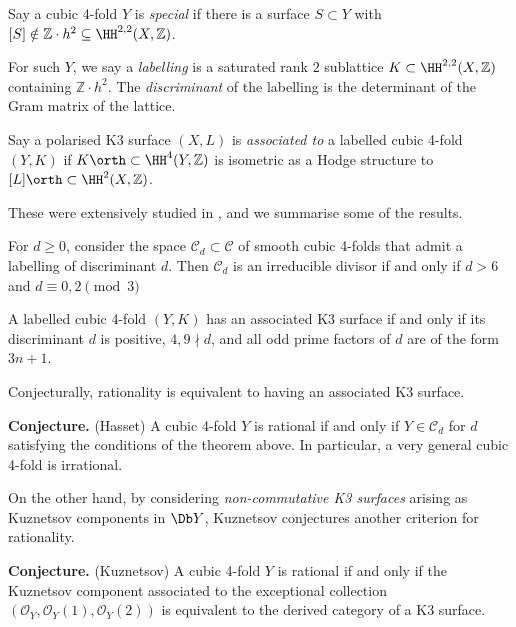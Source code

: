 \begin{definition}
    Say a cubic 4-fold \(Y\) is \textit{special} if there is a surface
    \(S\subset Y\) with \([S]\notin \mathbb{Z}\cdot h^2\subseteq
    \HH^{2,2}(X,\mathbb{Z})\).

    For such \(Y\), we say a \textit{labelling} is a saturated rank \(2\)
    sublattice \(K\subset \HH^{2,2}(X,\mathbb{Z})\) containing \(\mathbb{Z}\cdot
    h^2\). The \textit{discriminant} of the labelling is the determinant of the
    Gram matrix of the lattice.

    Say a polarised K3 surface \((X,L)\) is \textit{associated to} a labelled
    cubic 4-fold \((Y,K)\) if \(K\orth \subset \HH^4(Y,\mathbb{Z})\) is
    isometric as a Hodge structure to \([L]\orth\subset \HH^2(X,\mathbb{Z})\).
\end{definition}

These were extensively studied in \cite{hassettSpecialCubicFourfolds}, and
we summarise some of the results.

\begin{theorem}[(Hasset)]
    For \(d\geq 0\), consider the space \(\mathcal{C}_d\subset \mathcal{C}\) of
    smooth cubic 4-folds that admit a labelling of discriminant \(d\). Then
    \(\mathcal{C}_d\) is an irreducible divisor if and only if \(d>6\) and
    \(d\equiv 0,2\pmod 3\)
\end{theorem}

\begin{theorem}[(Hasset)]
    A labelled cubic 4-fold \((Y,K)\) has an associated K3 surface if and
    only if its discriminant \(d\) is positive, \(4,9\nmid d\), and all odd
    prime factors of \(d\) are of the form \(3n+1\).
\end{theorem}

Conjecturally, rationality is equivalent to having an associated K3 surface.

\textbf{Conjecture.} (Hasset) A cubic 4-fold \(Y\) is rational if and only if
\(Y\in \mathcal{C}_d\) for \(d\) satisfying the conditions of the theorem
above. In particular, a very general cubic 4-fold is irrational.

On the other hand, by considering \textit{non-commutative K3 surfaces} arising
as Kuznetsov components in \(\Db Y\), Kuznetsov conjectures another criterion
for rationality.

\textbf{Conjecture.} (Kuznetsov) A cubic 4-fold \(Y\) is rational if and only if
the Kuznetsov component associated to the exceptional collection
\((\mathscr{O}_Y,\mathscr{O}_Y(1),\mathscr{O}_Y(2))\) is equivalent to the
derived category of a K3 surface.
